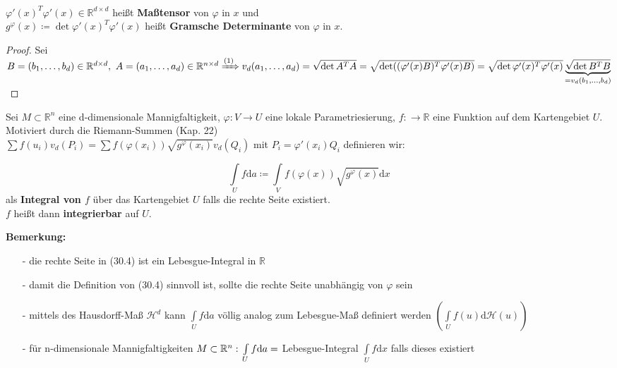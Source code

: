 \begin{definition}
    \mbox{} \\
    $\varphi'(x)^T \varphi'(x) \in \mathbb{R}^{d \times d} $
    heißt \textbf{Maßtensor} von $\varphi$ in $x$ und\\
    $g^\varphi (x) \coloneqq \det \varphi'(x)^T \varphi'(x) $
    heißt \textbf{Gramsche Determinante} von $\varphi$ in $x$.
\end{definition}

\begin{proof}
    Sei $B = (b_1, \ldots, b_d) \in \mathbb{R}^{d \times d},\ 
    A = (a_1, \ldots, a_d) \in \mathbb{R}^{n \times d} \\
    \xRightarrow{\text{(1)}} v_d(a_1, \ldots, a_d) 
    = \sqrt{\det A^T A} = \sqrt{\det ((\varphi'(x) B)^T \varphi'(x) B)}
    = \sqrt{\det \varphi'(x)^T \varphi'(x)} 
    \underbrace{\sqrt{\det B^T B}}_{= v_d(b_1, \ldots, b_d)}
    $
\end{proof}

Sei $M \subset \mathbb{R}^n $ eine d-dimensionale Mannigfaltigkeit,
$\varphi: V \rightarrow U $ eine lokale Parametriesierung,
$f: \rightarrow \mathbb{R} $ eine Funktion auf dem Kartengebiet $U$.\\
Motiviert durch die Riemann-Summen (Kap. 22)\\
$\sum f(u_i) v_d(P_i) = \sum f(\varphi(x_i)) \sqrt{g^\varphi (x_i)} v_d(Q_i) $
mit $P_i = \varphi'(x_i) Q_i $
definieren wir:

\begin{definition}
    \begin{equation}
        \int\limits_U f \mathrm{d}a 
        \coloneqq \int\limits_V f(\varphi(x)) \sqrt{g^\varphi (x)} \mathrm{d}x
    \end{equation}
    als \textbf{Integral von $f$} über das Kartengebiet $U$ falls die rechte
    Seite existiert.\\
    $f$ heißt dann \textbf{integrierbar} auf $U$.
\end{definition}

\textbf{Bemerkung:}
\begin{enumerate}
    \item[-]
        die rechte Seite in (30.4) ist ein Lebesgue-Integral in $\mathbb{R}$
    \item[-]
        damit die Definition von (30.4) sinnvoll ist, sollte die rechte Seite
        unabhängig von $\varphi$ sein
    \item[-]
        mittels des Hausdorff-Maß $\mathcal{H}^d $ kann
        $\int\limits_U f \mathrm{d}a $
        völlig analog zum Lebesgue-Maß definiert werden
        $\left(\int\limits_U f(u) \mathrm{d} \mathcal{H} (u) \right) $
    \item[-]
        für n-dimensionale Mannigfaltigkeiten $M \subset \mathbb{R}^n: \\
        \int\limits_U f \mathrm{d}a = $ Lebesgue-Integral 
        $\int\limits_U f \mathrm{d}x $ falls dieses existiert
\end{enumerate}

